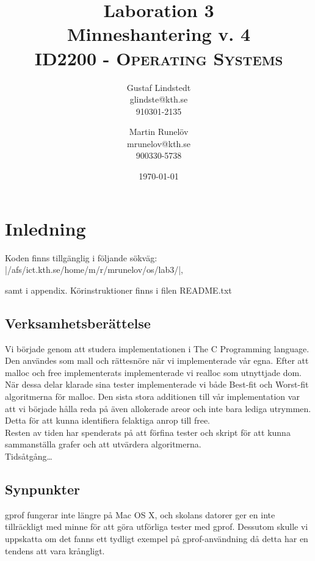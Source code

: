\documentclass[paper=a4, fontsize=11pt]{scrartcl} %
\title{ 
\huge Laboration 3 \\ Minneshantering v. 4 \\ %
\vspace{10pt}
\normalfont \normalsize 
\textsc{ID2200 - Operating Systems } \\ [25pt] %
}
\author{Gustaf Lindstedt \\ glindste@kth.se \\ 910301-2135 \and Martin Runelöv \\ mrunelov@kth.se \\ 900330-5738}
\date{\vspace{8pt}\normalsize\today} %
\numberwithin{equation}{section} %
\numberwithin{figure}{section} %
\numberwithin{table}{section} %
\begin{document}
\maketitle

\section{Inledning}

Koden finns tillgänglig i följande sökväg: |/afs/ict.kth.se/home/m/r/mrunelov/os/lab3/|,

samt i appendix. Körinstruktioner finns i filen README.txt



\subsection{Verksamhetsberättelse}

Vi började genom att studera implementationen i The C Programming language.
Den användes som mall och rättesnöre när vi implementerade vår egna.
Efter att malloc och free implementerats implementerade vi realloc som utnyttjade dom.
När dessa delar klarade sina tester implementerade vi både Best-fit och Worst-fit
algoritmerna för malloc.
Den sista stora additionen till vår implementation var att vi började hålla reda på
även allokerade areor och inte bara lediga utrymmen.
Detta för att kunna identifiera felaktiga anrop till free. \\

Resten av tiden har spenderats på att förfina tester och skript för att kunna sammanställa
grafer och att utvärdera algoritmerna.\\

Tidsåtgång\dots \\


\subsection{Synpunkter}
gprof fungerar inte längre på Mac OS X, och skolans datorer ger en inte tillräckligt med minne för att göra utförliga tester med gprof.
Dessutom skulle vi uppskatta om det fanns ett tydligt exempel på gprof-användning då detta har en tendens att vara krångligt.\\
\end{document}
